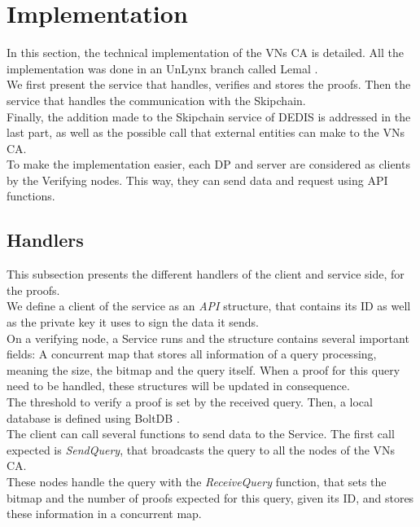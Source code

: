 \documentclass{article}
\begin{document}
\section{Implementation}
In this section, the technical implementation of the VNs CA is detailed. All the implementation was done in an UnLynx branch called Lemal \cite{lemal}.\\
We first present the service that handles, verifies and stores the proofs. Then the service that handles the communication with the Skipchain.\\
Finally, the addition made to the Skipchain service of DEDIS \cite{skipchain} is addressed in the last part, as well as the possible call that external entities can make to the VNs CA.\\

To make the implementation easier, each DP and server are considered as clients by the Verifying nodes. This way, they can send data and request using API functions.\\

\subsection{Handlers}
This subsection presents the different handlers of the client and service side, for the proofs.\\

We define a client of the service as an \textit{API} structure, that contains its ID as well as the private key it uses to sign the data it sends.\\
On a verifying node, a Service runs and the structure contains several important fields: A concurrent map that stores all information of a query processing, meaning the size, the bitmap and the query itself. When a proof for this query need to be handled, these structures will be updated in consequence.\\
The threshold to verify a proof is set by the received query. Then, a local database is defined using BoltDB \cite{bolt}.\\

The client can call several functions to send data to the Service. The first call expected is \textit{SendQuery}, that broadcasts the query to all the nodes of the VNs CA.\\
These nodes handle the query with the \textit{ReceiveQuery} function, that sets the bitmap and the number of proofs expected for this query, given its ID, and stores these information in a concurrent map.\\
\end{document}
